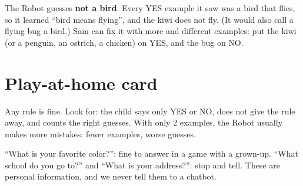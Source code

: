 \begin{answer}
The Robot guesses \textbf{not a bird}. Every YES example it saw was a bird that flies, so it learned \enquote{bird means flying}, and the kiwi does not fly. (It would also call a flying bug a bird.) Sam can fix it with more and different examples: put the kiwi (or a penguin, an ostrich, a chicken) on YES, and the bug on NO.
\end{answer}

\section{Play-at-home card}
\begin{answer}
Any rule is fine. Look for: the child says only YES or NO, does not give the rule away, and counts the right guesses. With only 2 examples, the Robot usually makes more mistakes: fewer examples, worse guesses.
\end{answer}

\begin{answer}
\enquote{What is your favorite color?}: fine to answer in a game with a grown-up. \enquote{What school do you go to?} and \enquote{What is your address?}: stop and tell. These are personal information, and we never tell them to a chatbot.
\end{answer}
